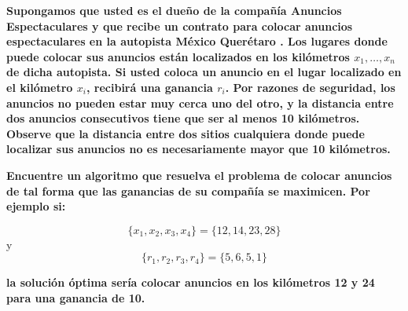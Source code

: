 \textbf{Supongamos que usted es el dueño de la compañía Anuncios Espectaculares y que recibe un contrato para colocar anuncios espectaculares en la autopista México Querétaro . Los lugares donde puede colocar sus anuncios están localizados en los kilómetros ${ x_1, \dots , x_n }$ de dicha autopista. Si usted coloca un anuncio en el lugar localizado en el kilómetro $x_i$, recibirá una ganancia $r_i$. Por razones de seguridad, los anuncios no pueden estar muy cerca uno del otro, y la distancia entre dos anuncios consecutivos tiene que ser al menos 10 kilómetros. Observe que la distancia entre dos sitios cualquiera donde puede localizar sus anuncios no es necesariamente mayor que 10 kilómetros. }

\textbf{Encuentre un algoritmo que resuelva el problema de colocar anuncios de tal forma que las ganancias de su compañía se maximicen. Por ejemplo si:}

$$\{x_1, x_2, x_3, x_4\} = \{12, 14, 23, 28\}$$
    y
$$\{r_1, r_2, r_3, r_4\} = \{5,6,5,1\}$$

\textbf{la solución óptima sería colocar anuncios en los kilómetros 12 y 24 para una ganancia de 10.}\vspace{.2cm}

\textcolor{bibi}{}
\begin{quote}
\end{quote}